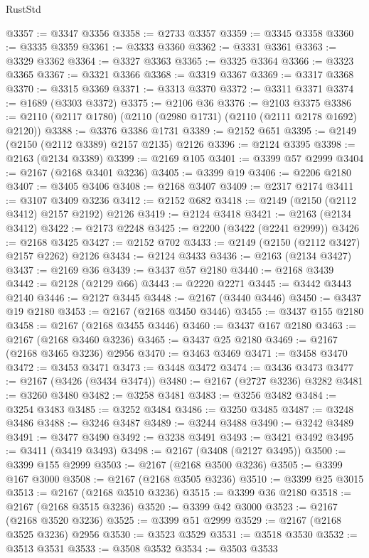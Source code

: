 \begin{lexlean}{RustStd}
\begin{coremodule}
@3357 := @3347 @3356
@3358 := @2733 @3357
@3359 := @3345 @3358
@3360 := @3335 @3359
@3361 := @3333 @3360
@3362 := @3331 @3361
@3363 := @3329 @3362
@3364 := @3327 @3363
@3365 := @3325 @3364
@3366 := @3323 @3365
@3367 := @3321 @3366
@3368 := @3319 @3367
@3369 := @3317 @3368
@3370 := @3315 @3369
@3371 := @3313 @3370
@3372 := @3311 @3371
@3374 := @1689 (@3303 @3372)
@3375 := @2106 @36
@3376 := @2103 @3375
@3386 := @2110 (@2117 @1780) (@2110 (@2980 @1731) (@2110 (@2111 @2178 @1692) @2120))
@3388 := @3376 @3386 @1731
@3389 := @2152 @651
@3395 := @2149 (@2150 (@2112 @3389) @2157 @2135) @2126
@3396 := @2124 @3395
@3398 := @2163 (@2134 @3389)
@3399 := @2169 @105
@3401 := @3399 @57 @2999
@3404 := @2167 (@2168 @3401 @3236)
@3405 := @3399 @19
@3406 := @2206 @2180
@3407 := @3405 @3406
@3408 := @2168 @3407
@3409 := @2317 @2174
@3411 := @3107 @3409 @3236
@3412 := @2152 @682
@3418 := @2149 (@2150 (@2112 @3412) @2157 @2192) @2126
@3419 := @2124 @3418
@3421 := @2163 (@2134 @3412)
@3422 := @2173 @2248
@3425 := @2200 (@3422 (@2241 @2999))
@3426 := @2168 @3425
@3427 := @2152 @702
@3433 := @2149 (@2150 (@2112 @3427) @2157 @2262) @2126
@3434 := @2124 @3433
@3436 := @2163 (@2134 @3427)
@3437 := @2169 @36
@3439 := @3437 @57 @2180
@3440 := @2168 @3439
@3442 := @2128 (@2129 @66)
@3443 := @2220 @2271
@3445 := @3442 @3443 @2140
@3446 := @2127 @3445
@3448 := @2167 (@3440 @3446)
@3450 := @3437 @19 @2180
@3453 := @2167 (@2168 @3450 @3446)
@3455 := @3437 @155 @2180
@3458 := @2167 (@2168 @3455 @3446)
@3460 := @3437 @167 @2180
@3463 := @2167 (@2168 @3460 @3236)
@3465 := @3437 @25 @2180
@3469 := @2167 (@2168 @3465 @3236) @2956
@3470 := @3463 @3469
@3471 := @3458 @3470
@3472 := @3453 @3471
@3473 := @3448 @3472
@3474 := @3436 @3473
@3477 := @2167 (@3426 (@3434 @3474))
@3480 := @2167 (@2727 @3236) @3282
@3481 := @3260 @3480
@3482 := @3258 @3481
@3483 := @3256 @3482
@3484 := @3254 @3483
@3485 := @3252 @3484
@3486 := @3250 @3485
@3487 := @3248 @3486
@3488 := @3246 @3487
@3489 := @3244 @3488
@3490 := @3242 @3489
@3491 := @3477 @3490
@3492 := @3238 @3491
@3493 := @3421 @3492
@3495 := @3411 (@3419 @3493)
@3498 := @2167 (@3408 (@2127 @3495))
@3500 := @3399 @155 @2999
@3503 := @2167 (@2168 @3500 @3236)
@3505 := @3399 @167 @3000
@3508 := @2167 (@2168 @3505 @3236)
@3510 := @3399 @25 @3015
@3513 := @2167 (@2168 @3510 @3236)
@3515 := @3399 @36 @2180
@3518 := @2167 (@2168 @3515 @3236)
@3520 := @3399 @42 @3000
@3523 := @2167 (@2168 @3520 @3236)
@3525 := @3399 @51 @2999
@3529 := @2167 (@2168 @3525 @3236) @2956
@3530 := @3523 @3529
@3531 := @3518 @3530
@3532 := @3513 @3531
@3533 := @3508 @3532
@3534 := @3503 @3533

\end{coremodule}
\end{lexlean}
